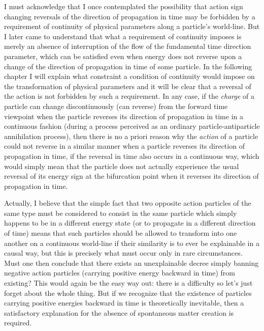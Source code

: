 \documentclass[notitlepage,12pt]{report}
\begin{document}
I must acknowledge that I once contemplated the possibility that action sign changing reversals of the direction of propagation in time may be forbidden by a requirement of continuity of physical parameters along a particle's world-line. But I later came to understand that what a requirement of continuity imposes is merely an absence of interruption of the flow of the fundamental time direction parameter, which can be satisfied even when energy does not reverse upon a change of the direction of propagation in time of some particle. In the following chapter I will explain what constraint a condition of continuity would impose on the transformation of physical parameters and it will be clear that a reversal of the action is not forbidden by such a requirement. In any case, if the \textit{charge} of a particle can change discontinuously (can reverse) from the forward time viewpoint when the particle reverses its direction of propagation in time in a continuous fashion (during a process perceived as an ordinary particle-antiparticle annihilation process), then there is no a priori reason why the \textit{action} of a particle could not reverse in a similar manner when a particle reverses its direction of propagation in time, if the reversal in time also occurs in a continuous way, which would simply mean that the particle does not actually experience the usual reversal of its energy sign at the bifurcation point when it reverses its direction of propagation in time.

Actually, I believe that the simple fact that two opposite action particles of the same type must be considered to consist in the same particle which simply happens to be in a different energy state (or to propagate in a different direction of time) means that such particles should be allowed to transform into one another on a continuous world-line if their similarity is to ever be explainable in a causal way, but this is precisely what must occur only in rare circumstances. Must one then conclude that there exists an unexplainable decree simply banning negative action particles (carrying positive energy backward in time) from existing? This would again be the easy way out: there is a difficulty so let's just forget about the whole thing. But if we recognize that the existence of particles carrying positive energies backward in time is theoretically inevitable, then a satisfactory explanation for the absence of spontaneous matter creation is required.
\end{document}
